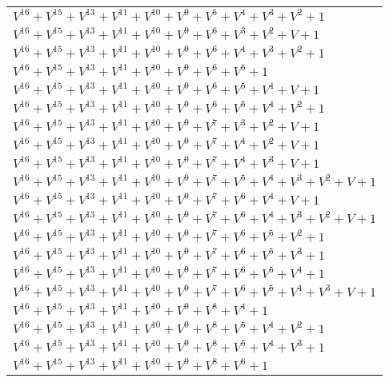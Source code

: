 \documentclass[12pt]{article}
\begin{document}
\begin{adjustwidth}{-4cm}{}
\begin{center}
\begin{longtable}{|l|}
$V^{16}  +V^{15}  +V^{13}  +V^{11}  +V^{10}  +V^{9}  +V^{5}  +V^{4}  +V^{3}  +V^{2}  + 1$ \\
$V^{16}  +V^{15}  +V^{13}  +V^{11}  +V^{10}  +V^{9}  +V^{6}  +V^{3}  +V^{2}  + V + 1$ \\
$V^{16}  +V^{15}  +V^{13}  +V^{11}  +V^{10}  +V^{9}  +V^{6}  +V^{4}  +V^{3}  +V^{2}  + 1$ \\
$V^{16}  +V^{15}  +V^{13}  +V^{11}  +V^{10}  +V^{9}  +V^{6}  +V^{5}  + 1$ \\
$V^{16}  +V^{15}  +V^{13}  +V^{11}  +V^{10}  +V^{9}  +V^{6}  +V^{5}  +V^{4}  + V + 1$ \\
$V^{16}  +V^{15}  +V^{13}  +V^{11}  +V^{10}  +V^{9}  +V^{6}  +V^{5}  +V^{4}  +V^{2}  + 1$ \\
$V^{16}  +V^{15}  +V^{13}  +V^{11}  +V^{10}  +V^{9}  +V^{7}  +V^{3}  +V^{2}  + V + 1$ \\
$V^{16}  +V^{15}  +V^{13}  +V^{11}  +V^{10}  +V^{9}  +V^{7}  +V^{4}  +V^{2}  + V + 1$ \\
$V^{16}  +V^{15}  +V^{13}  +V^{11}  +V^{10}  +V^{9}  +V^{7}  +V^{4}  +V^{3}  + V + 1$ \\
$V^{16}  +V^{15}  +V^{13}  +V^{11}  +V^{10}  +V^{9}  +V^{7}  +V^{5}  +V^{4}  +V^{3}  +V^{2}  + V + 1$ \\
$V^{16}  +V^{15}  +V^{13}  +V^{11}  +V^{10}  +V^{9}  +V^{7}  +V^{6}  +V^{4}  + V + 1$ \\
$V^{16}  +V^{15}  +V^{13}  +V^{11}  +V^{10}  +V^{9}  +V^{7}  +V^{6}  +V^{4}  +V^{3}  +V^{2}  + V + 1$ \\
$V^{16}  +V^{15}  +V^{13}  +V^{11}  +V^{10}  +V^{9}  +V^{7}  +V^{6}  +V^{5}  +V^{2}  + 1$ \\
$V^{16}  +V^{15}  +V^{13}  +V^{11}  +V^{10}  +V^{9}  +V^{7}  +V^{6}  +V^{5}  +V^{3}  + 1$ \\
$V^{16}  +V^{15}  +V^{13}  +V^{11}  +V^{10}  +V^{9}  +V^{7}  +V^{6}  +V^{5}  +V^{4}  + 1$ \\
$V^{16}  +V^{15}  +V^{13}  +V^{11}  +V^{10}  +V^{9}  +V^{7}  +V^{6}  +V^{5}  +V^{4}  +V^{3}  + V + 1$ \\
$V^{16}  +V^{15}  +V^{13}  +V^{11}  +V^{10}  +V^{9}  +V^{8}  +V^{4}  + 1$ \\
$V^{16}  +V^{15}  +V^{13}  +V^{11}  +V^{10}  +V^{9}  +V^{8}  +V^{5}  +V^{4}  +V^{2}  + 1$ \\
$V^{16}  +V^{15}  +V^{13}  +V^{11}  +V^{10}  +V^{9}  +V^{8}  +V^{5}  +V^{4}  +V^{3}  + 1$ \\
$V^{16}  +V^{15}  +V^{13}  +V^{11}  +V^{10}  +V^{9}  +V^{8}  +V^{6}  + 1$ \\

\end{longtable}
\end{center}
\end{adjustwidth}
\end{document}

